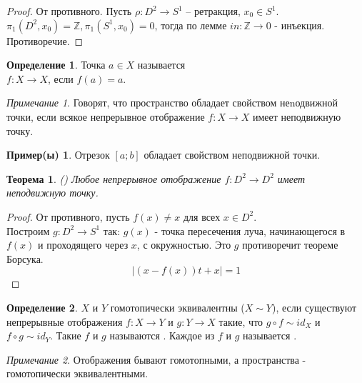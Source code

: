 \documentclass[a4paper]{article}
\theoremstyle{indented}
\newtheorem{theorem}{Теорема}
\theoremstyle{definition}
\newtheorem{defn}{Определение}
\newtheorem*{exl}{Пример(ы)}
\theoremstyle{remark}
\newtheorem*{remark}{Примечание}
\begin{document}
\begin{proof}
    От противного. Пусть $\rho: D^2 \to S^1$ – ретракция, $x_0 \in S^1$.
$\pi_1(D^2,x_0)=\mathbb{Z}, \pi_1(S^1,x_0)=0$, тогда по лемме $in: \mathbb{Z} \to 0$ - инъекция. Противоречие.
\end{proof}

\begin{defn}
    Точка $a\in X$ называется  \\
    $f: X \to X$, если $f(a)=a$.
\end{defn}

\begin{remark}
    Говорят, что пространство обладает свойством неnодвижной точки,
    если всякое непрерывное отображение $f: X \to X$ имеет неподвижную
    точку.
\end{remark}

\begin{exl}
    Отрезок $[a;b]$ обладает свойством неподвижной точки.
\end{exl}

\begin{theorem}
    () 
    Любое непрерывное отображение $f: D^2 \to D^2$ имеет неподвижную точку.
\end{theorem}

\begin{proof}
    От противного, пусть $f (x) \not= x$ для всех $x \in D^2$.\\
Построим $g : D^2 \to S^1$ так: $g(x)$ - точка пересечения луча,
начинающегося в $f(x)$ и проходящего через $x$, с окружностью.
Это $g$ противоречит теореме Борсука.
$$|(x-f(x))t+x|=1$$
\end{proof}

\begin{defn}
    $X$ и $Y$ гомотопически эквивалентны ($X \sim Y$), если существуют непрерывные отображения $f : X \to Y$ и $g : Y \to X$ такие, что $g \circ f \sim id_X$ и $f \circ g \sim id_Y$. Такие $f$ и $g$ называются .
    Каждое из $f$ и $g$ называется .
\end{defn}

\begin{remark}
    Отображения бывают гомотопными, а пространства - гомотопически
эквивалентными.
\end{remark}
\end{document}
